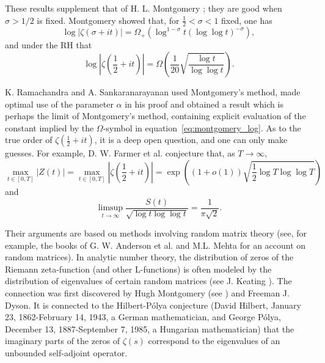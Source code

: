 \documentclass[11pt]{article}
\begin{document}
These results supplement that of H. L. Montgomery \cite{Mon2}; they are good when $\sigma > 1/2$ is fixed. Montgomery showed that, for $\frac{1}{2} < \sigma < 1$ fixed, one has
\begin{equation}\label{eq:montgomery_log}
\log |\zeta(\sigma + it)| = \Omega_{+}(\log^{1-\sigma} t(\log \log t)^{-\sigma}),
\end{equation}
and under the RH that
\begin{equation}\label{eq:montgomery_rh}
\log \left|\zeta\left(\frac{1}{2} + it\right)\right| = \Omega\left(\frac{1}{20} \sqrt{\frac{\log t}{\log \log t}}\right).
\end{equation}

K. Ramachandra and A. Sankaranarayanan \cite{RaSa1} used Montgomery's method, made optimal use of the parameter $\alpha$ in his proof and obtained a result which is perhaps the limit of Montgomery's method, containing explicit evaluation of the constant implied by the $\Omega$-symbol in equation~\eqref{eq:montgomery_log}. As to the true order of $\zeta(\frac{1}{2} + it)$, it is a deep open question, and one can only make guesses. For example, D. W. Farmer et al. \cite{FGH} conjecture that, as $T \to \infty$,
\begin{equation}\label{eq:farmer_conj1}
\max_{t \in [0,T]} |Z(t)| = \max_{t \in [0,T]} \left|\zeta\left(\frac{1}{2} + it\right)\right| = \exp\left((1 + o(1))\sqrt{\frac{1}{2} \log T \log \log T}\right)
\end{equation}
and
\begin{equation}\label{eq:farmer_conj2}
\limsup_{t \to \infty} \frac{S(t)}{\sqrt{\log t \log \log t}} = \frac{1}{\pi\sqrt{2}}.
\end{equation}

Their arguments are based on methods involving random matrix theory (see, for example, the books of G. W. Anderson et al. \cite{AGZ} and M.L. Mehta \cite{Meh} for an account on random matrices). In analytic number theory, the distribution of zeros of the Riemann zeta-function (and other L-functions) is often modeled by the distribution of eigenvalues of certain random matrices (see J. Keating \cite{Kea}). The connection was first discovered by Hugh Montgomery (see \cite{Mon1}) and Freeman J. Dyson. It is connected to the Hilbert-Pólya conjecture (David Hilbert, January 23, 1862-February 14, 1943, a German mathematician, and George Pólya, December 13, 1887-September 7, 1985, a Hungarian mathematician) that the imaginary parts of the zeros of $\zeta(s)$ correspond to the eigenvalues of an unbounded self-adjoint operator.
\end{document}
